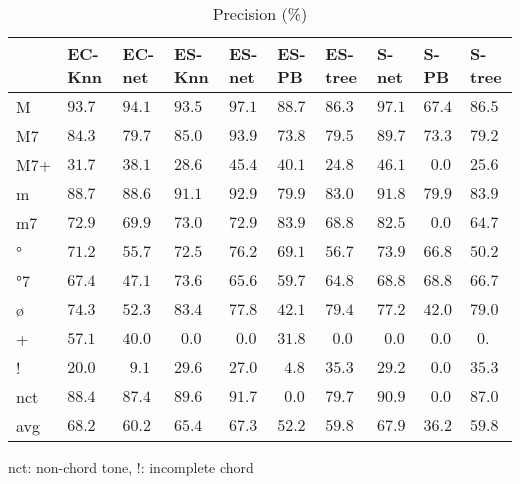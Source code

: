 \documentclass{article}
\begin{document}
\begin{table}
  \centering
  \begin{tabular}{l|p{.5cm}p{.5cm}p{.5cm}p{.5cm}p{.5cm}p{.5cm}p{.5cm}p{.5cm}p{.5cm}}
   & EC-Knn&EC-net &ES-Knn &ES-net &ES-PB  &ES-tree&S-net  &S-PB   &S-tree \\
\hline                                               
M  &$93.7 $&$ 94.1$&$ 93.5$&$ 97.1$&$ 88.7$&$ 86.3$&$ 97.1$&$ 67.4$&$86.5$   \\
M7 &$84.3 $&$ 79.7$&$ 85.0$&$ 93.9$&$ 73.8$&$ 79.5$&$ 89.7$&$ 73.3$&$79.2$   \\
M7+&$31.7 $&$ 38.1$&$ 28.6$&$ 45.4$&$ 40.1$&$ 24.8$&$ 46.1$&$~~0.0$&$25.6$   \\
m  &$88.7 $&$ 88.6$&$ 91.1$&$ 92.9$&$ 79.9$&$ 83.0$&$ 91.8$&$ 79.9$&$83.9$   \\
m7 &$72.9 $&$ 69.9$&$ 73.0$&$ 72.9$&$ 83.9$&$ 68.8$&$ 82.5$&$~~0.0$&$64.7$   \\
°  &$71.2 $&$ 55.7$&$ 72.5$&$ 76.2$&$ 69.1$&$ 56.7$&$ 73.9$&$ 66.8$&$50.2$   \\
°7 &$67.4 $&$ 47.1$&$ 73.6$&$ 65.6$&$ 59.7$&$ 64.8$&$ 68.8$&$ 68.8$&$66.7$   \\
ø  &$74.3 $&$ 52.3$&$ 83.4$&$ 77.8$&$ 42.1$&$ 79.4$&$ 77.2$&$ 42.0$&$79.0$   \\
+  &$57.1 $&$ 40.0$&$~~0.0$&$~~0.0$&$ 31.8$&$~~0.0$&$~~0.0$&$~~0.0$&$~~0.$   \\
!  &$20.0 $&$~~9.1$&$ 29.6$&$ 27.0$&$~~4.8$&$ 35.3$&$ 29.2$&$~~0.0$&$35.3$   \\
nct&$88.4 $&$ 87.4$&$ 89.6$&$ 91.7$&$~~0.0$&$ 79.7$&$ 90.9$&$~~0.0$&$87.0$   \\
avg&$68.2 $&$ 60.2$&$ 65.4$&$ 67.3$&$ 52.2$&$ 59.8$&$ 67.9$&$ 36.2$&$59.8$   \\

  \end{tabular}

\medskip

nct: non-chord tone, !: incomplete chord

  \caption{Precision (\%)}
  \label{tab:precision}
\end{table}
\end{document}
